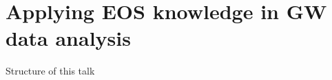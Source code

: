 \documentclass[usenames,dvipsnames,t]{beamer}
\begin{document}






    
    


\section{Applying EOS knowledge in GW data analysis}

\begin{frame}{Structure of this talk}
  
\end{frame}
\end{document}

